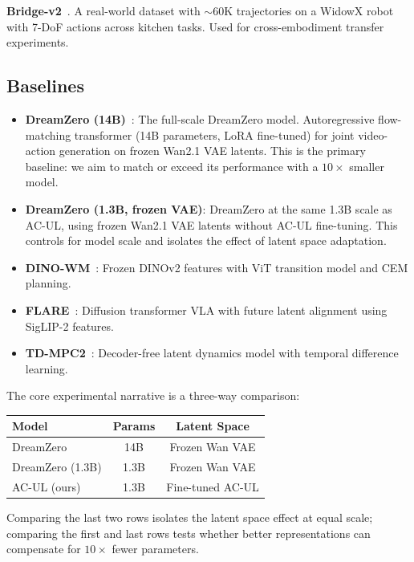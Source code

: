 \documentclass{article}
\begin{document}
\textbf{Bridge-v2}~\citep{walke2023bridgedata}.
A real-world dataset with ${\sim}60$K trajectories on a WidowX robot with 7-DoF actions across kitchen tasks. Used for cross-embodiment transfer experiments.

\subsection{Baselines}
\label{sec:baselines}

\begin{itemize}[leftmargin=*,itemsep=2pt]
  \item \textbf{DreamZero (14B)}~\citep{dreamzero2025}: The full-scale DreamZero model. Autoregressive flow-matching transformer (14B parameters, LoRA fine-tuned) for joint video-action generation on frozen Wan2.1 VAE latents. This is the primary baseline: we aim to match or exceed its performance with a $10\times$ smaller model.
  \item \textbf{DreamZero (1.3B, frozen VAE)}: DreamZero at the same 1.3B scale as AC-UL, using frozen Wan2.1 VAE latents without AC-UL fine-tuning. This controls for model scale and isolates the effect of latent space adaptation.
  \item \textbf{DINO-WM}~\citep{zhou2024dinowm}: Frozen DINOv2 features with ViT transition model and CEM planning.
  \item \textbf{FLARE}~\citep{nvidia2025flare}: Diffusion transformer VLA with future latent alignment using SigLIP-2 features.
  \item \textbf{TD-MPC2}~\citep{hansen2024tdmpc2}: Decoder-free latent dynamics model with temporal difference learning.
\end{itemize}

The core experimental narrative is a three-way comparison:
\begin{center}
\begin{tabular}{lcc}
\toprule
\textbf{Model} & \textbf{Params} & \textbf{Latent Space} \\
\midrule
DreamZero & 14B & Frozen Wan VAE \\
DreamZero (1.3B) & 1.3B & Frozen Wan VAE \\
AC-UL (ours) & 1.3B & Fine-tuned AC-UL \\
\bottomrule
\end{tabular}
\end{center}
Comparing the last two rows isolates the latent space effect at equal scale; comparing the first and last rows tests whether better representations can compensate for $10\times$ fewer parameters.
\end{document}
